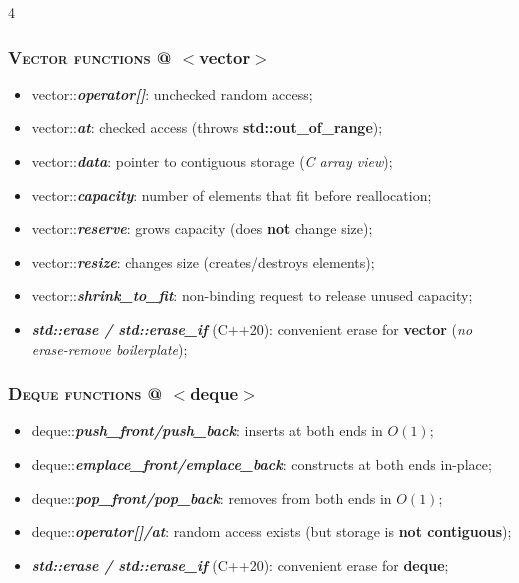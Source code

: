 \documentclass[10pt]{article}
\begin{document}
\begin{multicols*}{4}
{\subsubsection*{\textsc{Vector functions} @ $<$vector$>$} 
\begin{itemize}[leftmargin=*,topsep=0.25pt]
  \setlength\itemsep{-1.8pt}
  \item vector::\emph{\textbf{operator[]}}: unchecked random access;
  \item vector::\emph{\textbf{at}}: checked access (throws \textbf{std::out\_of\_range});
  \item vector::\emph{\textbf{data}}: pointer to contiguous storage (\emph{C array view});
  \item vector::\emph{\textbf{capacity}}: number of elements that fit before reallocation;
  \item vector::\emph{\textbf{reserve}}: grows capacity (does \textbf{not} change size);
  \item vector::\emph{\textbf{resize}}: changes size (creates/destroys elements);
  \item vector::\emph{\textbf{shrink\_to\_fit}}: non-binding request to release unused capacity;
  \item \emph{\textbf{std::erase / std::erase\_if}} (C++20): convenient erase for \textbf{vector} (\emph{no erase-remove boilerplate});
\end{itemize}

\subsubsection*{\textsc{Deque functions} @ $<$deque$>$} 
\begin{itemize}[leftmargin=*,topsep=0.25pt]
  \setlength\itemsep{-1.8pt}
  \item deque::\emph{\textbf{push\_front/push\_back}}: inserts at both ends in $O(1)$;
  \item deque::\emph{\textbf{emplace\_front/emplace\_back}}: constructs at both ends in-place;
  \item deque::\emph{\textbf{pop\_front/pop\_back}}: removes from both ends in $O(1)$;
  \item deque::\emph{\textbf{operator[]/at}}: random access exists (but storage is \textbf{not contiguous});
  \item \emph{\textbf{std::erase / std::erase\_if}} (C++20): convenient erase for \textbf{deque};
\end{itemize}

}
\end{multicols*}
\end{document}
